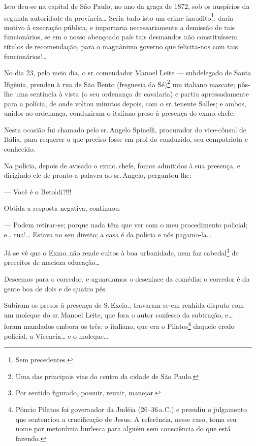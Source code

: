 Isto deu-se na capital de São Paulo, no ano da graça de 1872, sob os
auspícios da segunda autoridade da província\ldots{} Seria tudo isto um crime
inaudito\footnote{ Sem precedentes.}; daria motivo à execração pública,
e importaria necessariamente a demissão de tais funcionários, se em o
nosso abençoado país tais desmandos não constituíssem títulos de
recomendação, para o magnânimo governo que felicita-nos com tais
funcionários!\ldots{}

No dia 23, pelo meio dia, o sr.\,comendador Manoel Leite --- subdelegado
de Santa Ifigênia, prendeu à rua de São Bento (freguesia da
Sé)\footnote{ Uma das principais vias do centro da cidade de São Paulo.}
um italiano mascate; pôs-lhe uma sentinela à vista (o seu ordenança de
cavalaria) e partiu apressadamente para a polícia, de onde voltou
minutos depois, com o sr.\,tenente Salles; e ambos, unidos ao ordenança,
conduziram o italiano preso à presença do exmo.\,chefe.

Nesta ocasião fui chamado pelo sr.\,Angelo Spinelli, procurador do
vice-cônsul de Itália, para requerer o que preciso fosse em prol do
conduzido, seu compatriota e conhecido.

Na polícia, depois de avisado o exmo.\,chefe, fomos admitidos à sua
presença, e dirigindo ele de pronto a palavra ao sr.\,Angelo,
perguntou-lhe:

--- Você é o Betoldi?!!!

Obtida a resposta negativa, continuou:

--- Podem retirar-se; porque nada têm que ver com o meu procedimento
policial; e\ldots{} rua!\ldots{} Estava no seu direito; a casa é da polícia e nós
pagamo-la\ldots{}

Já se vê que o Exmo.\,não rende cultos à boa urbanidade, nem faz
cabedal\footnote{ Por sentido figurado, possuir, reunir, manejar.} de
preceitos de macieza educação\ldots{}

Descemos para o corredor, e aguardamos o desenlace da comédia: o
corredor é da gente boa de dois e de quatro pés.

Subiram os presos à presença de S.\,Excia.; travaram-se em renhida
disputa com um moleque do sr.\,Manoel Leite, que fora o autor confesso da
subtração, e\ldots{} foram mandados embora os três: o italiano, que era o
Pilatos\footnote{ Pôncio Pilatos foi governador da Judéia (26--36\,a.C.) e
  presidiu o julgamento que sentenciou a crucificação de Jesus. A
  referência, nesse caso, toma seu nome por metonímia burlesca para
  alguém sem consciência do que está fazendo.} daquele credo policial, a
Vicencia\ldots{} e o moleque\ldots{}

